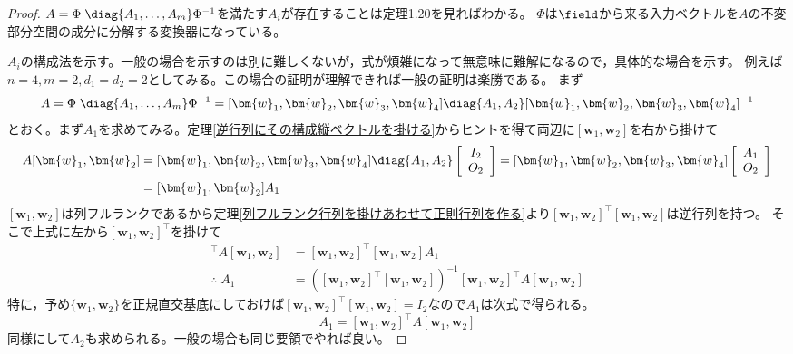         \begin{proof}
            \quad\par
            $A = \Phi\;\diag{A_1,\dotsc,A_m}\Phi^{-1}$を満たす$A_i$が存在することは\cite{システム線形代数}定理1.20を見ればわかる。
            $\Phi$は$\field$から来る入力ベクトルを$A$の不変部分空間の成分に分解する変換器になっている。
            \par
            $A_i$の構成法を示す。一般の場合を示すのは別に難しくないが，式が煩雑になって無意味に難解になるので，具体的な場合を示す。
            例えば$n=4, m=2, d_1=d_2=2$としてみる。この場合の証明が理解できれば一般の証明は楽勝である。
            まず
            \[A = \Phi\;\diag{A_1,\dotsc,A_m}\Phi^{-1} = [\bm{w}_1,\bm{w}_2,\bm{w}_3,\bm{w}_4]\diag{A_1,A_2}[\bm{w}_1,\bm{w}_2,\bm{w}_3,\bm{w}_4]^{-1}\]
            とおく。まず$A_1$を求めてみる。定理\ref{逆行列にその構成縦ベクトルを掛ける}からヒントを得て両辺に$[\bm{w}_1,\bm{w}_2]$を右から掛けて
            \begin{align*}
                A[\bm{w}_1,\bm{w}_2] &= [\bm{w}_1,\bm{w}_2,\bm{w}_3,\bm{w}_4]\diag{A_1,A_2}
                \left[
                    \begin{array}{c}
                        I_2\\
                        O_2
                    \end{array}
                \right] = [\bm{w}_1,\bm{w}_2,\bm{w}_3,\bm{w}_4]
                \left[
                    \begin{array}{c}
                        A_1\\
                        O_2
                    \end{array}
                \right]\\
                &= [\bm{w}_1,\bm{w}_2]A_1
            \end{align*}
            $[\bm{w}_1,\bm{w}_2]$は列フルランクであるから定理\ref{列フルランク行列を掛けあわせて正則行列を作る}より$[\bm{w}_1,\bm{w}_2]^\top[\bm{w}_1,\bm{w}_2]$は逆行列を持つ。
            そこで上式に左から$[\bm{w}_1,\bm{w}_2]^\top$を掛けて
            \begin{align*}
                [\bm{w}_1,\bm{w}_2]^\top A[\bm{w}_1,\bm{w}_2] &= [\bm{w}_1,\bm{w}_2]^\top[\bm{w}_1,\bm{w}_2]A_1\\
                \therefore\;A_1 &= ([\bm{w}_1,\bm{w}_2]^\top[\bm{w}_1,\bm{w}_2])^{-1}[\bm{w}_1,\bm{w}_2]^\top A[\bm{w}_1,\bm{w}_2]
            \end{align*}
            特に，予め$\{\bm{w}_1,\bm{w}_2\}$を正規直交基底にしておけば$[\bm{w}_1,\bm{w}_2]^\top[\bm{w}_1,\bm{w}_2] = I_2$なので$A_1$は次式で得られる。
            \[A_1 = [\bm{w}_1,\bm{w}_2]^\top A[\bm{w}_1,\bm{w}_2]\]
            同様にして$A_2$も求められる。一般の場合も同じ要領でやれば良い。
        \end{proof}
